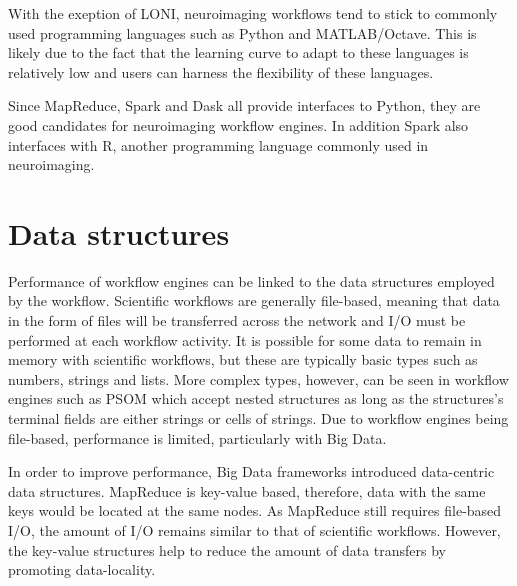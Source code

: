 \documentclass{report}
\begin{document}
            With the exeption of LONI, neuroimaging workflows tend to stick to
            commonly used programming languages such as Python and MATLAB/Octave.
            This is likely due to the fact that the learning curve to adapt to
            these languages is relatively low and users can harness the 
            flexibility of these languages. 
            
            Since MapReduce, Spark and Dask all provide interfaces to Python,  
            they are good candidates for neuroimaging workflow engines. In addition
            Spark also interfaces with R, another programming language commonly
            used in neuroimaging.

            \section{Data structures}\label{ds}
                
                Performance of workflow engines can be linked to the data structures
                employed by the workflow. Scientific
                workflows are generally file-based, meaning that data in the 
                form of files will be 
                transferred across the network and I/O must be
                performed at each workflow activity. It is possible for some 
                data to remain in memory with scientific workflows, but these 
                are typically basic types such as numbers, strings and lists.
                More complex types, however, can be seen in workflow engines 
                such as PSOM which accept nested structures as long as the
                structures's terminal fields are either strings or cells of 
                strings. Due to workflow engines being file-based, performance
                is limited, particularly with Big Data.
                
                In order to improve performance, Big Data frameworks introduced
                data-centric data structures. MapReduce is key-value based, 
                therefore, data with the same keys would be located at the
                same nodes. As MapReduce still requires file-based I/O, the 
                amount of I/O remains similar to that of scientific workflows. 
                However, the key-value structures help to reduce the amount 
                of data transfers by promoting data-locality.
\end{document}
